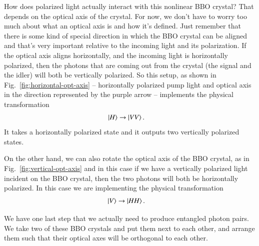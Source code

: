 How does polarized light actually interact with this nonlinear BBO crystal? That depends on the optical axis of the crystal. For now, we don't have to worry too much about what an optical axis is and how it's defined. Just remember that there is some kind of special direction in which the BBO crystal can be aligned and that's very important relative to the incoming light and its polarization. If the optical axis aligns horizontally, and the incoming light is horizontally polarized, then the photons that are coming out from the crystal (the signal and the idler) will both be vertically polarized. So this setup, as shown in Fig.~\ref{fig:horizontal-opt-axis} -- horizontally polarized pump light and optical axis in the direction represented by the purple arrow -- implements the physical transformation
\begin{equation}
\begin{aligned}
\left| H \right\rangle &\rightarrow \left| VV \right\rangle.
\end{aligned}
\end{equation}
It takes a horizontally polarized state and it outputs two vertically polarized states.

On the other hand, we can also rotate the optical axis of the BBO crystal, as in Fig.~\ref{fig:vertical-opt-axis} and in this case if we have a vertically polarized light incident on the BBO crystal, then the two photons will both be horizontally polarized.  In this case we are implementing the physical transformation
\begin{equation}
\begin{aligned}
\left| V \right\rangle &\rightarrow \left| HH \right\rangle.
\end{aligned}
\end{equation}


We have one last step that we actually need to produce entangled photon pairs.  We take two of these BBO crystals and put them next to each other, and arrange them such that their optical axes will be orthogonal to each other.

